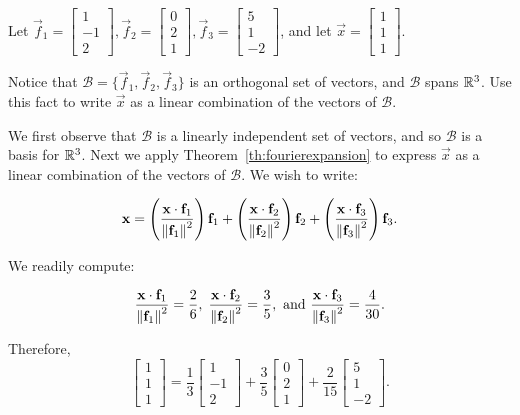 \documentclass{ximera}
\begin{document}
\begin{example}\label{fourier}
Let
$\vec{f}_1= \begin{bmatrix}
1 \\ -1 \\ 2
\end{bmatrix},
\vec{f}_2= \begin{bmatrix}
0 \\ 2 \\ 1 
\end{bmatrix},
\vec{f}_3 =\begin{bmatrix}
5 \\ 1 \\ -2
\end{bmatrix}$,
and let
$\vec{x} =\begin{bmatrix}
1 \\ 1 \\ 1
\end{bmatrix}$.  

Notice that $\mathcal{B}=\{ \vec{f}_1, \vec{f}_2, \vec{f}_3\}$
is an orthogonal set of vectors, and $\mathcal{B}$ spans $\mathbb{R}^3$.  Use this fact to write $\vec{x}$ as  a linear combination of the vectors of $\mathcal{B}$.

\begin{explanation}
We first observe that $\mathcal{B}$ is a linearly independent set of vectors, and so $\mathcal{B}$ is a basis for $\mathbb{R}^3$. Next we apply Theorem~\ref{th:fourierexpansion} to express $\vec{x}$ as  a linear combination of the vectors of $\mathcal{B}$.  We wish to write:

\[
\mathbf{x}   =
\left(\frac{\mathbf{x}\cdot \mathbf{f}_1}{\left\lVert\mathbf{f}_1\right\rVert^2}\right) \mathbf{f}_1 +
\left(\frac{\mathbf{x}\cdot \mathbf{f}_2}{\left\lVert\mathbf{f}_2\right\rVert^2}\right) \mathbf{f}_2 +
\left(\frac{\mathbf{x}\cdot \mathbf{f}_3}{\left\lVert\mathbf{f}_3\right\rVert^2}\right) \mathbf{f}_3.
\]

We readily compute:

\[
\frac{\mathbf{x}\cdot\mathbf{f}_1}{\left\lVert\mathbf{f}_1\right\rVert^2} = \frac{2}{6}, \;
\frac{\mathbf{x}\cdot\mathbf{f}_2}{\left\lVert\mathbf{f}_2\right\rVert^2} = \frac{3}{5},
\mbox{ and }
\frac{\mathbf{x}\cdot\mathbf{f}_3}{\left\lVert\mathbf{f}_3\right\rVert^2} = \frac{4}{30}.\]

Therefore,
\[ \begin{bmatrix}
1 \\ 1 \\ 1
\end{bmatrix}
= \frac{1}{3}\begin{bmatrix}
1 \\ -1 \\ 2
\end{bmatrix}
+\frac{3}{5}\begin{bmatrix}
0 \\ 2 \\ 1
\end{bmatrix}
+\frac{2}{15}\begin{bmatrix}
5 \\ 1 \\ -2
\end{bmatrix}.\]
\end{explanation} 
\end{example}
\end{document}
